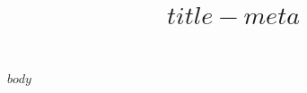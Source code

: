 \documentclass{article}
\begin{document}
\sloppy
\twocolumn

\title{$title-meta$}

$body$
\end{document}
